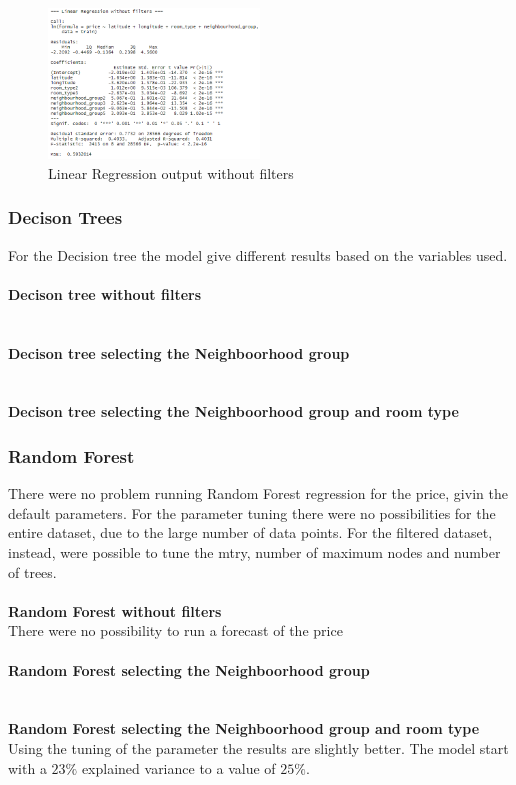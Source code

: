 \documentclass{FR16}
\begin{document}
\begin{figure}[H]
\centering
\includegraphics[width=0.5\textwidth]{figures/lm1.PNG} 
\caption{\label{fig:5} Linear Regression output without filters }
\end{figure}





\subsubsection{Decison Trees}
For the Decision tree the model give different results based on the variables used.
\\\\ \textbf{Decison tree  without filters}\\
\\\\
\textbf{Decison tree selecting the Neighboorhood group}\\
\\\\ 
\textbf{Decison tree  selecting the Neighboorhood group and room type}
\subsubsection{Random Forest}
There were no problem running Random Forest regression for the price, givin the default parameters. For the parameter tuning there were no possibilities for the entire dataset, due to the large number of data points. For the filtered dataset, instead, were possible to tune the mtry, number of maximum nodes and number of trees.
\\\\ \textbf{Random Forest  without filters}\\
There were no possibility to run a forecast of the price
\\\\
\textbf{Random Forest selecting the Neighboorhood group}\\
\\\\ 
\textbf{Random Forest selecting the Neighboorhood group and room type}
Using the tuning of the parameter the results are slightly better. The model start with a $23\%$ explained variance to a value of $25\%$.
\end{document}
